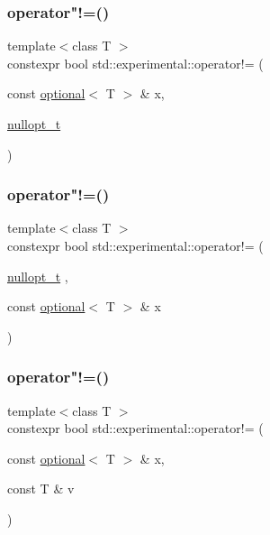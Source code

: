 \subsubsection{\texorpdfstring{operator"!=()}{operator!=()}\hspace{0.1cm}{\footnotesize\ttfamily [2/9]}}
{\footnotesize\ttfamily template$<$class T $>$ \\
constexpr bool std\+::experimental\+::operator!= (\begin{DoxyParamCaption}\item[{const \mbox{\hyperlink{classstd_1_1experimental_1_1optional}{optional}}$<$ T $>$ \&}]{x,  }\item[{\mbox{\hyperlink{structstd_1_1experimental_1_1nullopt__t}{nullopt\+\_\+t}}}]{ }\end{DoxyParamCaption})\hspace{0.3cm}{\ttfamily [noexcept]}}

\mbox{\label{namespacestd_1_1experimental_aa340c9c2a57fd083695e470ded11c089}} 
\subsubsection{\texorpdfstring{operator"!=()}{operator!=()}\hspace{0.1cm}{\footnotesize\ttfamily [3/9]}}
{\footnotesize\ttfamily template$<$class T $>$ \\
constexpr bool std\+::experimental\+::operator!= (\begin{DoxyParamCaption}\item[{\mbox{\hyperlink{structstd_1_1experimental_1_1nullopt__t}{nullopt\+\_\+t}}}]{,  }\item[{const \mbox{\hyperlink{classstd_1_1experimental_1_1optional}{optional}}$<$ T $>$ \&}]{x }\end{DoxyParamCaption})\hspace{0.3cm}{\ttfamily [noexcept]}}

\mbox{\label{namespacestd_1_1experimental_a65194017839ffdd2eeeb2f8f510d9a84}} 
\subsubsection{\texorpdfstring{operator"!=()}{operator!=()}\hspace{0.1cm}{\footnotesize\ttfamily [4/9]}}
{\footnotesize\ttfamily template$<$class T $>$ \\
constexpr bool std\+::experimental\+::operator!= (\begin{DoxyParamCaption}\item[{const \mbox{\hyperlink{classstd_1_1experimental_1_1optional}{optional}}$<$ T $>$ \&}]{x,  }\item[{const T \&}]{v }\end{DoxyParamCaption})}

